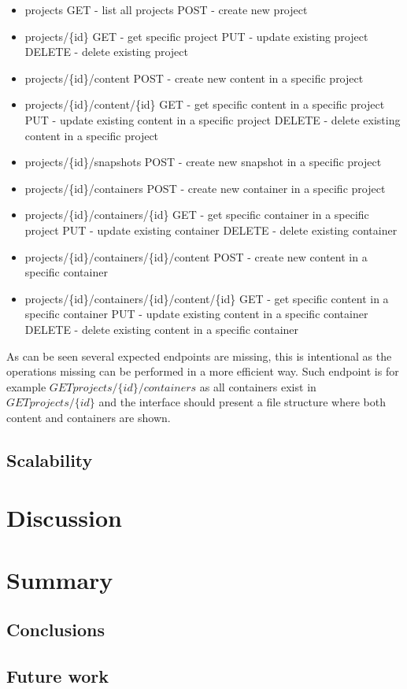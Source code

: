 \documentclass[a4paper,12pt]{article}
\begin{document}
\begin{itemize}
  \item projects
      \subitem GET - list all projects
      \subitem POST - create new project
  \item projects/\{id\}
      \subitem GET - get specific project
      \subitem PUT - update existing project
      \subitem DELETE - delete existing project
  \item projects/\{id\}/content
      \subitem POST - create new content in a specific project 
  \item projects/\{id\}/content/\{id\}
      \subitem GET - get specific content in a specific project
      \subitem PUT - update existing content in a specific project
      \subitem DELETE - delete existing content in a specific project

  \item projects/\{id\}/snapshots
      \subitem POST - create new snapshot in a specific project 

  \item projects/\{id\}/containers
      \subitem POST - create new container in a specific project 
  \item projects/\{id\}/containers/\{id\}
      \subitem GET - get specific container in a specific project
      \subitem PUT - update existing container
      \subitem DELETE - delete existing container
  \item projects/\{id\}/containers/\{id\}/content
      \subitem POST - create new content in a specific container 
  \item projects/\{id\}/containers/\{id\}/content/\{id\}
      \subitem GET - get specific content in a specific container
      \subitem PUT - update existing content in a specific container
      \subitem DELETE - delete existing content in a specific container
\end{itemize}

As can be seen several expected endpoints are missing, this is intentional as the operations missing can be performed in 
a more efficient way. Such endpoint is for example $GET projects/\{id\}/containers$ as all containers exist in 
$GET projects/\{id\}$ and the interface should present a file structure where both content and containers are shown.

\subsection{Scalability}

\section{Discussion}

\section{Summary}
\subsection{Conclusions}

\subsection{Future work}






\newpage


\end{document}
